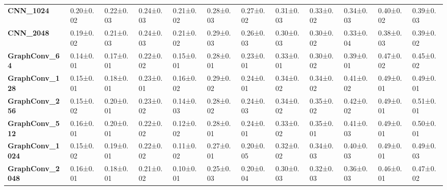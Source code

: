 \begin{tabular}{llllllllllll}
\textbf{CNN\_1024      } &   0.20±0.02 &  0.22±0.03 &  0.24±0.03 &  0.21±0.02 &  0.28±0.03 &  0.27±0.02 &  0.31±0.03 &  0.33±0.02 &  0.34±0.03 &   0.40±0.02 &   0.39±0.03 \\
\textbf{CNN\_2048      } &   0.19±0.02 &  0.21±0.03 &  0.24±0.03 &  0.21±0.02 &  0.29±0.03 &  0.26±0.03 &  0.30±0.03 &  0.30±0.02 &  0.33±0.04 &   0.38±0.03 &   0.39±0.02 \\
\textbf{GraphConv\_64  } &   0.14±0.01 &  0.17±0.01 &  0.22±0.02 &  0.15±0.01 &  0.28±0.01 &  0.23±0.01 &  0.33±0.01 &  0.30±0.02 &  0.39±0.01 &   0.47±0.02 &   0.45±0.02 \\
\textbf{GraphConv\_128 } &   0.15±0.01 &  0.18±0.01 &  0.23±0.01 &  0.16±0.02 &  0.29±0.02 &  0.24±0.01 &  0.34±0.02 &  0.34±0.02 &  0.41±0.02 &   0.49±0.01 &   0.49±0.01 \\
\textbf{GraphConv\_256 } &   0.15±0.02 &  0.20±0.01 &  0.23±0.02 &  0.14±0.03 &  0.28±0.02 &  0.24±0.03 &  0.34±0.02 &  0.35±0.02 &  0.42±0.02 &   0.49±0.01 &   0.51±0.01 \\
\textbf{GraphConv\_512 } &   0.16±0.01 &  0.20±0.01 &  0.22±0.02 &  0.12±0.02 &  0.28±0.01 &  0.24±0.01 &  0.33±0.02 &  0.35±0.01 &  0.41±0.03 &   0.49±0.01 &   0.50±0.01 \\
\textbf{GraphConv\_1024} &   0.15±0.02 &  0.19±0.01 &  0.22±0.02 &  0.11±0.02 &  0.27±0.01 &  0.20±0.05 &  0.32±0.02 &  0.34±0.03 &  0.40±0.03 &   0.49±0.01 &   0.49±0.03 \\
\textbf{GraphConv\_2048} &   0.16±0.01 &  0.18±0.01 &  0.21±0.02 &  0.10±0.01 &  0.25±0.03 &  0.20±0.04 &  0.30±0.03 &  0.32±0.03 &  0.36±0.03 &   0.46±0.01 &   0.47±0.02 \\
\bottomrule
\end{tabular}
